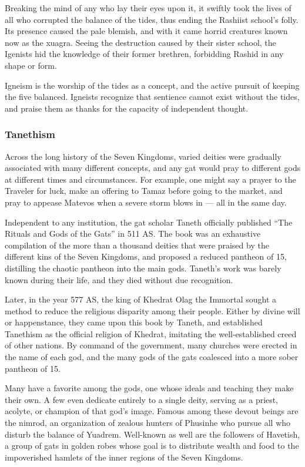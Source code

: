 Breaking the mind of any who lay their eyes upon it, it swiftly took the lives of all who corrupted the balance of the tides, thus ending the Rashiist school's folly.
Its presence caused the pale blemish, and with it came horrid creatures known now as the xuagra.
Seeing the destruction caused by their sister school, the Igenists hid the knowledge of their former brethren, forbidding Rashid in any shape or form.

Igneism is the worship of the tides as a concept, and the active pursuit of keeping the five balanced.
Igneists recognize that sentience cannot exist without the tides, and praise them as thanks for the capacity of independent thought.

\subsubsection{Tanethism}
Across the long history of the Seven Kingdoms, varied deities were gradually associated with many different concepts, and any gat would pray to different gods at different times and circumstances.
For example, one might say a prayer to the Traveler for luck, make an offering to Tamaz before going to the market, and pray to appease Matevos when a severe storm blows in --- all in the same day.

Independent to any institution, the gat scholar Taneth officially published ``The Rituals and Gods of the Gats'' in 511 AS.
The book was an exhaustive compilation of the more than a thousand deities that were praised by the different kins of the Seven Kingdoms, and proposed a reduced pantheon of 15, distilling the chaotic pantheon into the main gods.
Taneth's work was barely known during their life, and they died without due recognition.

Later, in the year 577 AS, the king of Khedrat Olag the Immortal sought a method to reduce the religious disparity among their people.
Either by divine will or happenstance, they came upon this book by Taneth, and established Tanethism as the official religion of Khedrat, imitating the well-established creed of other nations.
By command of the government, many churches were erected in the name of each god, and the many gods of the gats coalesced into a more sober pantheon of 15.

Many have a favorite among the gods, one whose ideals and teaching they make their own.
A few even dedicate entirely to a single deity, serving as a priest, acolyte, or champion of that god's image.
Famous among these devout beings are the nimrod, an organization of zealous hunters of Phusinhe who pursue all who disturb the balance of Yuadrem.
Well-known as well are the followers of Havetish, a group of gats in golden robes whose goal is to distribute wealth and food to the impoverished hamlets of the inner regions of the Seven Kingdoms.

